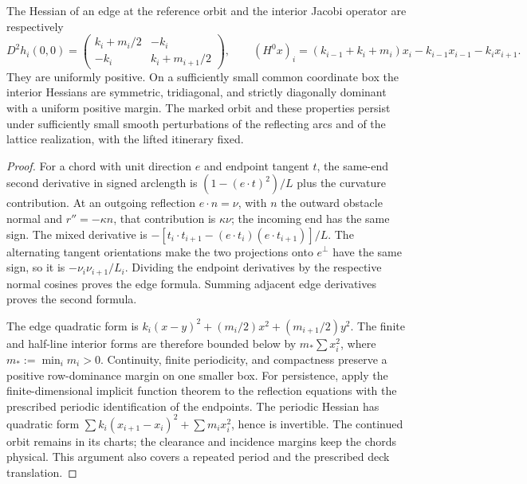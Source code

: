 \begin{lemma}\label{lem:v64-geometric-jacobi}
The Hessian of an edge at the reference orbit and the interior Jacobi
operator are respectively
\begin{equation}\label{eq:v64-geometric-hessian}
 D^2h_i(0,0)=
 \begin{pmatrix} k_i+m_i/2&-k_i\\-k_i&k_i+m_{i+1}/2\end{pmatrix},
 \qquad
 (H^0x)_i=(k_{i-1}+k_i+m_i)x_i-k_{i-1}x_{i-1}-k_ix_{i+1}.
\end{equation}
They are uniformly positive.  On a sufficiently small common coordinate
box the interior Hessians are symmetric, tridiagonal, and strictly
diagonally dominant with a uniform positive margin.  The marked orbit
and these properties persist under sufficiently small smooth perturbations
of the reflecting arcs and of the lattice realization, with the lifted
itinerary fixed.
\end{lemma}
\begin{proof}
For a chord with unit direction $e$ and endpoint tangent $t$, the
same-end second derivative in signed arclength is
$(1-(e\cdot t)^2)/L$ plus the curvature contribution.  At an outgoing
reflection $e\cdot n=\nu$, with $n$ the outward obstacle normal and
$r''=-\kappa n$, that contribution is $\kappa\nu$; the incoming end
has the same sign.  The mixed derivative is
$-[t_i\cdot t_{i+1}-(e\cdot t_i)(e\cdot t_{i+1})]/L$.
The alternating tangent orientations make the two projections onto
$e^\perp$ have the same sign, so it is
$-\nu_i\nu_{i+1}/L_i$.  Dividing the endpoint derivatives by the
respective normal cosines proves the edge formula.  Summing adjacent
edge derivatives proves the second formula.

The edge quadratic form is
$k_i(x-y)^2+(m_i/2)x^2+(m_{i+1}/2)y^2$.
The finite and half-line interior forms are therefore bounded below by
$m_*\sum x_i^2$, where $m_*:=\min_i m_i>0$.
Continuity, finite periodicity, and compactness preserve a positive
row-dominance margin on one smaller box.  For persistence, apply the
finite-dimensional implicit function theorem to the reflection equations
with the prescribed periodic identification of the endpoints.  The
periodic Hessian has quadratic form
$\sum k_i(x_{i+1}-x_i)^2+\sum m_i x_i^2$, hence is invertible.
The continued orbit remains in its charts; the clearance and incidence
margins keep the chords physical.  This argument also covers a repeated
period and the prescribed deck translation.
\end{proof}


